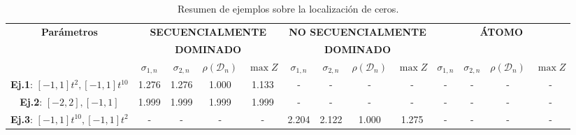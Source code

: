 \begin{table}
	\centering
	\footnotesize
	\caption{Resumen de ejemplos sobre la localización de ceros.}
	\begin{tabular}{|c|cccc|cccc|cccc|}
		\hline
		\multirow{3}{*}{\textbf{Parámetros}}       & \multicolumn{4}{c|}{\textbf{SECUENCIALMENTE}} & \multicolumn{4}{c|}{\textbf{NO SECUENCIALMENTE}} & \multicolumn{4}{c|}{\textbf{ÁTOMO}}                                                                                                                                                                      \\
		                                           & \multicolumn{4}{c|}{\textbf{DOMINADO}}        & \multicolumn{4}{c|}{\textbf{DOMINADO}}           & \multicolumn{4}{c|}{}                                                                                                                                                                                    \\
		\cline{2-13}
		                                           & $\sigma_{1,n}$                                & $\sigma_{2,n}$                                   & $\rho(\mathcal{D}_{n})$             & $\max Z$ & $\sigma_{1,n}$       & $\sigma_{2,n}$ & $\rho(\mathcal{D}_{n})$ & $\max Z$ & $\sigma_{1,n}$       & $\sigma_{2,n}$ & $\rho(\mathcal{D}_{n})$ & $\max Z$ \\
		\hline
		\textbf{Ej.1}: $[-1,1]t^2, [-1,1]t^{10}$   & 1.276                                         & 1.276                                            & 1.000                               & 1.133    & -                    & -              & -                       & -        & -                    & -              & -                       & -        \\
		\textbf{Ej.2}: $[-2,2], [-1,1]$            & 1.999                                         & 1.999                                            & 1.999                               & 1.999    & -                    & -              & -                       & -        & -                    & -              & -                       & -        \\
		\textbf{Ej.3}: $[-1,1]t^{10}, [-1,1]t^{2}$ & -                                             & -                                                & -                                   & -        & 2.204                & 2.122          & 1.000                   & 1.275    & -                    & -              & -                       & -        \\

\end{tabular}
\end{table}
